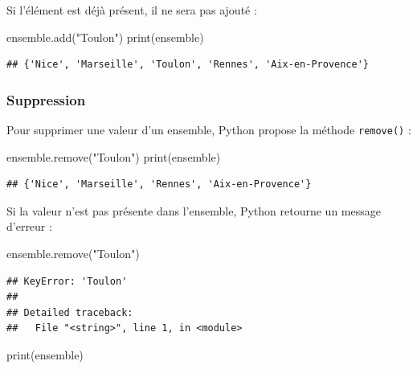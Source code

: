 \documentclass[12pt,]{book}
\newenvironment{Shaded}{\begin{snugshade}}{\end{snugshade}}
\newcommand{\StringTok}[1]{\textcolor[rgb]{0.31,0.60,0.02}{#1}}
\newcommand{\BuiltInTok}[1]{#1}
\newcommand{\NormalTok}[1]{#1}
\numberwithin{equation}{section}
\numberwithin{countremarque}{section}
\begin{document}
Si l'élément est déjà présent, il ne sera pas ajouté :

\begin{Shaded}
\begin{Highlighting}[]
\NormalTok{ensemble.add(}\StringTok{"Toulon"}\NormalTok{)}
\BuiltInTok{print}\NormalTok{(ensemble)}
\end{Highlighting}
\end{Shaded}

\begin{lstlisting}
## {'Nice', 'Marseille', 'Toulon', 'Rennes', 'Aix-en-Provence'}
\end{lstlisting}

\subsubsection{Suppression}\label{suppression}

Pour supprimer une valeur d'un ensemble, Python propose la méthode
\texttt{remove()} :

\begin{Shaded}
\begin{Highlighting}[]
\NormalTok{ensemble.remove(}\StringTok{"Toulon"}\NormalTok{)}
\BuiltInTok{print}\NormalTok{(ensemble)}
\end{Highlighting}
\end{Shaded}

\begin{lstlisting}
## {'Nice', 'Marseille', 'Rennes', 'Aix-en-Provence'}
\end{lstlisting}

Si la valeur n'est pas présente dans l'ensemble, Python retourne un
message d'erreur :

\begin{Shaded}
\begin{Highlighting}[]
\NormalTok{ensemble.remove(}\StringTok{"Toulon"}\NormalTok{)}
\end{Highlighting}
\end{Shaded}

\begin{lstlisting}
## KeyError: 'Toulon'
## 
## Detailed traceback: 
##   File "<string>", line 1, in <module>
\end{lstlisting}

\begin{Shaded}
\begin{Highlighting}[]
\BuiltInTok{print}\NormalTok{(ensemble)}
\end{Highlighting}
\end{Shaded}
\end{document}
